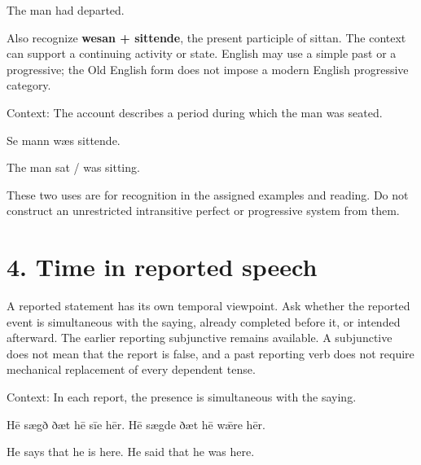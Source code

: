 The man had departed.

Also recognize \textbf{wesan + sittende}, the present participle of sittan. The context can support a continuing activity or state. English may use a simple past or a progressive; the Old English form does not impose a modern English progressive category.

Context: The account describes a period during which the man was seated.

Se mann wæs sittende.

The man sat /\allowbreak{} was sitting.

These two uses are for recognition in the assigned examples and reading. Do not construct an unrestricted intransitive perfect or progressive system from them.

\section*{4. Time in reported speech}

A reported statement has its own temporal viewpoint. Ask whether the reported event is simultaneous with the saying, already completed before it, or intended afterward. The earlier reporting subjunctive remains available. A subjunctive does not mean that the report is false, and a past reporting verb does not require mechanical replacement of every dependent tense.

Context: In each report, the presence is simultaneous with the saying.

Hē sægð ðæt hē sīe hēr. Hē sægde ðæt hē wǣre hēr.

He says that he is here. He said that he was here.

